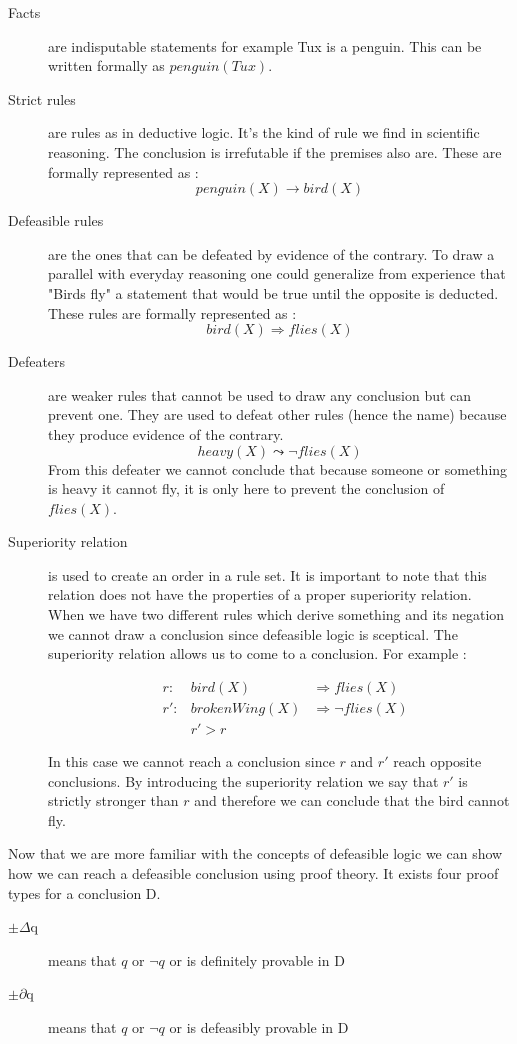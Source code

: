 \documentclass[10pt]{report}
\begin{document}
\begin{description}
\item[Facts] are indisputable statements for example Tux is a penguin. This can be written formally as $penguin(Tux)$.
\item[Strict rules] are rules as in deductive logic. It's the kind of rule we find in scientific reasoning. The conclusion is irrefutable if the premises also are. These are formally represented as : 
$$penguin(X) \rightarrow bird(X)$$
\item[Defeasible rules] are the ones that can be defeated by evidence of the contrary. To draw a parallel with everyday reasoning one could generalize from experience that "Birds fly" a statement that would be true until the opposite is deducted. These rules are formally represented as :
$$bird(X) \Rightarrow flies(X)$$
\item[Defeaters] are weaker rules that cannot be used to draw any conclusion but can prevent one. They are used to defeat other rules (hence the name) because they produce evidence of the contrary. 
$$heavy(X) \leadsto \neg flies(X)$$
From this defeater we cannot conclude that because someone or something is heavy it cannot fly, it is only here to prevent the conclusion of $flies(X)$.
\item[Superiority relation] is used to create an order in a rule set. It is important to note that this relation does not have the properties of a proper superiority relation. When we have two different rules which derive something and its negation we cannot draw a conclusion since defeasible logic is sceptical. The superiority relation allows us to come to a conclusion. For example :

\[
\begin{aligned}
& r :&      bird(X) &\Rightarrow flies(X)\\
& r':&brokenWing(X) &\Rightarrow \neg flies(X)\\
& & r'>r
\end{aligned}
\]

In this case we cannot reach a conclusion since $r$ and $r'$ reach opposite conclusions. By introducing the superiority relation we say that $r'$ is strictly stronger than $r$ and therefore we can conclude that the bird cannot fly.
\end{description}

Now that we are more familiar with the concepts of defeasible logic we can show how we can reach a defeasible conclusion using proof theory. It exists four proof types for a conclusion D.
\begin{description}
\item[$\pm\Delta$q] means that $q$ or $\neg q$ or is definitely provable in D
\item[$\pm\partial$q] means that $q$ or $\neg q$ or is defeasibly provable in D
\end{description}
\end{document}
